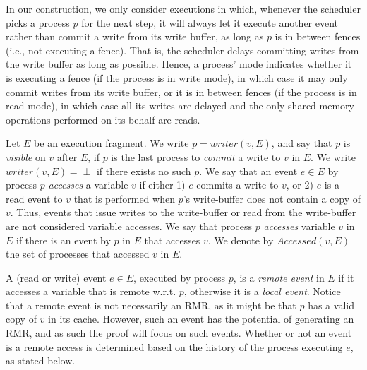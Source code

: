 In our construction, we only consider executions in which, whenever the scheduler picks a process $p$ for the next step, it will always let it execute another event rather than commit a write from its write buffer,
as long as $p$ is in between fences (i.e., not executing a fence). That is, the scheduler delays committing writes from the write buffer as long as possible. Hence, a process' mode indicates whether it is executing a fence (if the process is in write mode), in which case it may only commit writes from its write buffer, or it is in between fences (if the process is in read mode), in which case all its writes are delayed
and the only shared memory operations performed on its behalf are reads.

Let $E$ be an execution fragment. We write $p = writer(v,E)$, and say that $p$ is \emph{visible} on $v$ after $E$, if $p$ is the last process
to \emph{commit} a write to $v$ in $E$. We write $writer(v,E) = \perp$ if there exists no such $p$.
We say that an event $e \in E$ by process $p$ \emph{accesses} a variable $v$ if either 1) $e$ commits a write to $v$,
or 2) $e$ is a read event to $v$ that is performed when $p$'s write-buffer does not contain a copy of $v$.
Thus, events that issue writes to the write-buffer or read from the write-buffer are not considered variable accesses.
We say that process $p$ \emph{accesses} variable $v$ in $E$ if there is an event by $p$ in $E$ that accesses $v$. We denote by $Accessed(v,E)$ the set of processes that accessed $v$ in $E$.

A (read or write) event $e \in E$, executed by process $p$, is a \emph{remote event} in $E$ if it accesses a variable that
is remote w.r.t. $p$, otherwise it is a \emph{local event}.
Notice that a remote event is not necessarily an RMR, as it might be that $p$ has a valid copy of $v$ in its cache. However, such an event has the potential of generating an RMR, and as such the proof will focus on such events.
Whether or not an event is a remote access is determined based on the history
of the process executing $e$, as stated below.

